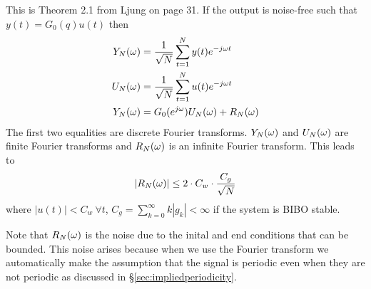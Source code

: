 \begin{theorem}
This is Theorem 2.1 from Ljung on page 31.
If the output is noise-free such that $y(t)=G_0(q)u(t)$ then
\begin{align*}
Y_N(\omega) &= \frac{1}{\sqrt{N}}\sum_{t=1}^Ny(t)e^{-j\omega t} \\
U_N(\omega) &= \frac{1}{\sqrt{N}}\sum_{t=1}^Nu(t)e^{-j\omega t} \\
Y_N(\omega) &= G_0(e^{j\omega})U_N(\omega) + R_N(\omega)
\end{align*}
The first two equalities are discrete Fourier transforms. $Y_N(\omega)$ and $U_N(\omega)$ are finite Fourier transforms and $R_N(\omega)$ is an infinite Fourier transform. This leads to
$$|R_N(\omega)| \leq 2\cdot C_w\cdot \frac{C_g}{\sqrt{N}}$$
where $|u(t)|<C_w ~\forall t$, $C_g=\sum_{k=0}^\infty k|g_k|<\infty$ if the system is BIBO stable.
\end{theorem}
Note that $R_N(\omega)$ is the noise due to the inital and end conditions that can be bounded. This noise arises because when we use the Fourier transform we automatically make the assumption that the signal is periodic even when they are not periodic as discussed in \S\ref{sec:impliedperiodicity}.

